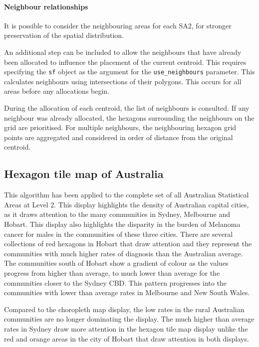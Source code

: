 \hypertarget{neighbour-relationships}{%
\paragraph{Neighbour relationships}\label{neighbour-relationships}}

It is possible to consider the neighbouring areas for each SA2, for
stronger preservation of the spatial distribution.

An additional step can be included to allow the neighbours that have
already been allocated to influence the placement of the current
centroid. This requires specifying the \texttt{sf} object as the
argument for the \texttt{use\_neighbours} parameter. This calculates
neighbours using intersections of their polygons. This occurs for all
areas before any allocations begin.

During the allocation of each centroid, the list of neighbours is
consulted. If any neighbour was already allocated, the hexagons
surrounding the neighbours on the grid are prioritised. For multiple
neighbours, the neighbouring hexagon grid points are aggregated and
considered in order of distance from the original centroid.

\hypertarget{hexagon-tile-map-of-australia}{%
\subsection{Hexagon tile map of
Australia}\label{hexagon-tile-map-of-australia}}

This algorithm has been applied to the complete set of all Australian
Statistical Areas at Level 2. This display highlights the density of
Australian capital cities, as it draws attention to the many communities
in Sydney, Melbourne and Hobart. This display also highlights the
disparity in the burden of Melanoma cancer for males in the communities
of these three cities. There are several collections of red hexagons in
Hobart that draw attention and they represent the communities with much
higher rates of diagnosis than the Australian average. The communities
south of Hobart show a gradient of colour as the values progress from
higher than average, to much lower than average for the communities
closer to the Sydney CBD. This pattern progresses into the communities
with lower than average rates in Melbourne and New South Wales.

Compared to the choropleth map display, the low rates in the rural
Australian communities are no longer dominating the display. The much
higher than average rates in Sydney draw more attention in the hexagon
tile map display unlike the red and orange areas in the city of Hobart
that draw attention in both displays.

